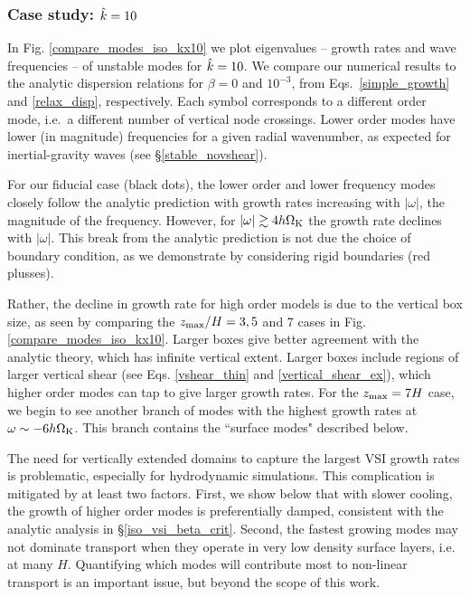 \subsubsection{Case study: $\hat{k}=10$}
In Fig. \ref{compare_modes_iso_kx10} we plot eigenvalues -- growth rates and
wave frequencies -- of unstable 
modes for $\hat{k}=10$.  We compare our numerical results to the analytic dispersion relations for 
$\beta = 0$ and $10^{-3}$, from Eqs.\ \ref{simple_growth} and \ref{relax_disp}, respectively. Each symbol 
corresponds to a different order mode, i.e.\ a different number of vertical node crossings.  Lower order modes
have lower (in magnitude) frequencies for a given radial wavenumber, as expected for inertial-gravity waves (see \S\ref{stable_novshear}).

For our fiducial case (black dots), the lower order and lower frequency modes closely follow the analytic prediction with growth rates increasing with $|\omega|$, the magnitude of the frequency.  However, for $|\omega| \gtrsim 4 h \Omega_{\rm K}$ the growth rate declines with $|\omega|$.  This break from the analytic prediction is not due the choice of boundary condition, as we demonstrate by considering rigid boundaries (red plusses).

Rather, the decline in growth rate for high order models is due to the vertical box size, as seen by comparing the $z_\mathrm{max}/H = 3, 5$ and 7 cases in Fig. \ref{compare_modes_iso_kx10}.  Larger boxes give better agreement with the analytic theory, which has infinite vertical extent.  Larger boxes include regions of larger vertical shear (see Eqs. \ref{vshear_thin} and \ref{vertical_shear_ex}), which higher order modes can tap to give larger growth rates.   For the $z_\mathrm{max} = 7 H$ case, we begin to see another branch of modes with the highest growth rates at $\omega \sim -6 h\Omega_{\rm K}$. This branch contains the  ``surface modes" described below.  

The need for vertically extended domains to capture the largest VSI growth rates is problematic, especially for hydrodynamic simulations.  This  complication is mitigated by at least two factors.  First, we show below that with slower cooling, the growth of higher order modes is preferentially damped, consistent with the analytic analysis in \S\ref{iso_vsi_beta_crit}.  Second, the fastest growing modes may not dominate transport when they operate in very low density  surface layers, i.e. at many $H$.   Quantifying which modes will contribute most to non-linear transport is an important issue, but beyond the scope of this work.


